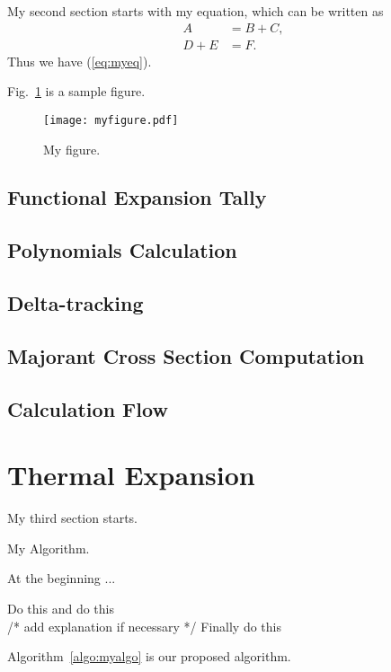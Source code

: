 \documentclass[11pt,a4paper,onecolumn,oneside]{report}
\begin{document}
My second section starts with my equation, which can be written as 
%
\begin{equation}\label{eq:myeq}
\begin{split}
	A 		&= B + C, \\
    D + E	&= F.
\end{split}
\end{equation}
Thus we have (\ref{eq:myeq}).

Fig.~\ref{fig:myfigure} is a sample figure. 

\begin{figure}[h]
\centering
\texttt{[image: myfigure.pdf]}
\caption{My figure.} \label{fig:myfigure}
\end{figure}


\subsection{Functional Expansion Tally}
\subsection{Polynomials Calculation}
\subsection{Delta-tracking}
\subsection{Majorant Cross Section Computation}
\subsection{Calculation Flow}


\newpage 
\section{Thermal Expansion} 
My third section starts. 

\begin{algorithm}
	\caption{My Algorithm.} \label{algo:myalgo}
    At the beginning ...
    
	\begin{algorithmic}[1]	    
	    \STATE Do this
        \STATE and do this\\
        /* add explanation if necessary */
        \STATE Finally do this
	\end{algorithmic} 
\end{algorithm}
%
Algorithm~\ref{algo:myalgo} is our proposed algorithm.
\end{document}
